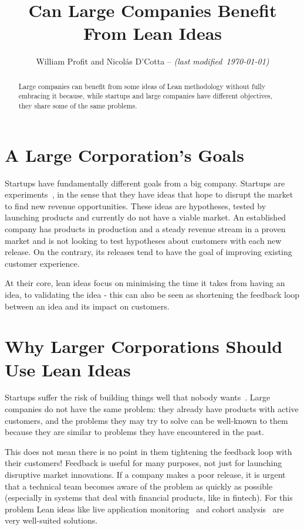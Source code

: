 \documentclass[conference]{IEEEtran}
\title{Can Large Companies Benefit From Lean Ideas}
\begin{document}
    \author{William Profit and Nicolás D'Cotta --
     \emph{(last modified~\today)}}

    \maketitle

    \begin{abstract}
        Large companies can benefit from some ideas of Lean methodology without fully embracing it because, while startups and large companies have different objectives, they share some of the same problems.
    \end{abstract}


    \section{A Large Corporation's Goals}
    \label{section:intro}
    Startups have fundamentally different goals from a big company.
    Startups are experiments~\cite{theLeanStartup}, in the sense that they have ideas that hope to disrupt the market to find new revenue opportunities.
    These ideas are hypotheses, tested by launching products and currently do not have a viable market.
    An established company has products in production and a steady
    revenue stream in a proven market and is not looking to test hypotheses about customers with each new release.
    On the contrary, its releases tend to have the goal of improving existing customer experience.

    At their core, lean ideas focus on minimising the time it takes from having an idea, to validating the idea - this can also be seen as shortening the feedback loop between an idea and its impact on customers.


    \section{Why Larger Corporations Should Use Lean Ideas}
    Startups suffer the risk of building things well that nobody wants~\cite{theLeanStartup}.
    Large companies do not have the same problem: they already have products with active customers, and
    the problems they may try to solve can be well-known to them because they are similar to problems
    they have encountered in the past.

    This does not mean there is no point in them tightening the feedback
    loop with their customers! Feedback is useful for many purposes, not just for launching disruptive market innovations.
    If a company makes a poor release, it is urgent that a technical team becomes aware of the problem as quickly as possible
    (especially in systems that deal with financial products, like in fintech).
    For this problem Lean ideas like live application monitoring~\cite{dragichApm} and cohort analysis~\cite{theLeanStartupBlog} are very well-suited solutions.
\end{document}
